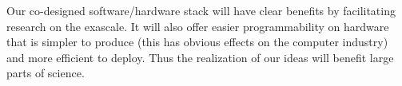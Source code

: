 %
Our co-designed software/hardware stack will have clear benefits
by facilitating research on the exascale. It will also offer easier
programmability on hardware that is simpler to produce (this has
obvious effects on the computer industry) and more efficient 
to deploy. Thus the realization of our ideas will benefit
large parts of science.

\endinput
\bparagraph{Team}
%
The PIs combine in-depth knowledge of the practice and theory of
parallel programming and the development of high performance hardware.

%
\begin{comment}
  The increasing importance of loosely-coupled parallelism stands in stark
  contrast to the almost complete absence of the concepts of processor-to-processor
  communication and synchronization in the architectural specifications of the
  microprocessor architectures in use today.  It seems exceedingly unlikely 
  that architectures that do not recognize the existence of communication and 
  synchronization as fundamental concepts will ever be able to provide those
  functions in an efficient manner.  Thus, a fundamental rethinking of hardware
  architecture appears to be mandatory.

  The likely hybrid nature of exascale hardware
  would only be addressable by a combination of
  currently existing programming models, so a new model that takes
  an integrative approach would be needed.

  It is becoming clear that power consumption is becoming an
  increasingly important factor in system design and operation.
  At the lowest level of hardware, the dynamic power utilization associated 
  with data motion now exceeds that of computation, with a trend toward
  increasing disparity over time.  Therefore both hardware and software
  models must be redesigned to make data motion visible and controllable,
  so that locality can be exploited to the maximum extent possible.

  Ideas for improved control of data motion (both "horizontally" between processing
  elements and "vertically" through the memory hierarchy) exist in the literature, but
  none are based on a comprehensive re-thinking of the memory hierarchy, the 
  differences between memory access and communication, and the possibilities for
  fundamentally different hardware implementation of these basic concepts in
  a hardware/software co-design project.
\end{comment}
